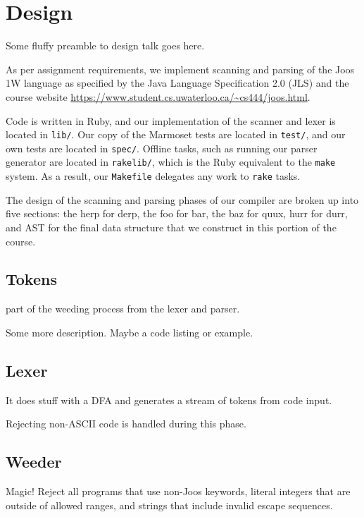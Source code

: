 \documentclass[pdftex,11pt,a4paper]{article}
\begin{document}

\section{Design}

Some fluffy preamble to design talk goes here.

As per assignment requirements, we implement scanning and parsing of
the Joos 1W language as specified by the Java Language Specification
2.0 (JLS) and the course website
\url{https://www.student.cs.uwaterloo.ca/~cs444/joos.html}.

Code is written in Ruby, and our implementation of the scanner and
lexer is located in \texttt{lib/}. Our copy of the Marmoset tests are
located in \texttt{test/}, and our own tests are located in
\texttt{spec/}. Offline tasks, such as running our parser generator
are located in \texttt{rakelib/}, which is the Ruby equivalent to the
\texttt{make} system. As a result, our \texttt{Makefile} delegates any
work to \texttt{rake} tasks.

The design of the scanning and parsing phases of our compiler are
broken up into five sections: the herp for derp, the foo for bar, the
baz for quux, hurr for durr, and AST for the final data structure that
we construct in this portion of the course.


\subsection{Tokens}
part of the weeding process from the lexer and parser.

Some more description. Maybe a code listing or example.


\subsection{Lexer}

It does stuff with a DFA and generates a stream of tokens from code
input.

Rejecting non-ASCII code is handled during this phase.


\subsection{Weeder}

Magic! Reject all programs that use non-Joos keywords, literal
integers that are outside of allowed ranges, and strings that include
invalid escape sequences.
\end{document}
